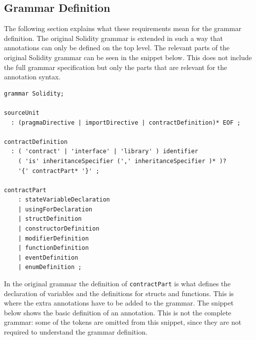 \documentclass[a4paper]{article}
\begin{document}
\subsection{Grammar Definition}
The following section explains what these requirements mean for the grammar definition. The original Solidity grammar is extended in such a way that annotations can only be defined on the top level. The relevant parts of the original Solidity grammar can be seen in the snippet below. This does not include the full grammar specification but only the parts that are relevant for the annotation syntax.

\begin{lstlisting}[basicstyle=\ttfamily]
grammar Solidity;

sourceUnit
  : (pragmaDirective | importDirective | contractDefinition)* EOF ;

contractDefinition
  : ( 'contract' | 'interface' | 'library' ) identifier
    ( 'is' inheritanceSpecifier (',' inheritanceSpecifier )* )?
    '{' contractPart* '}' ;

contractPart
    : stateVariableDeclaration
    | usingForDeclaration
    | structDefinition
    | constructorDefinition
    | modifierDefinition
    | functionDefinition
    | eventDefinition
    | enumDefinition ;
\end{lstlisting}
In the original grammar the definition of \texttt{contractPart} is what defines the declaration of variables and the definitions for structs and functions. This is where the extra annotations have to be added to the grammar. The snippet below shows the basic definition of an annotation. This is not the complete grammar: some of the tokens are omitted from this snippet, since they are not required to understand the grammar definition.
\end{document}
